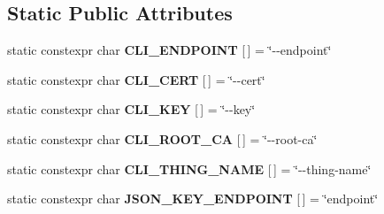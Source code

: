 \subsection*{Static Public Attributes}
\begin{DoxyCompactItemize}
\item 
\mbox{\label{struct_aws_1_1_iot_1_1_device_client_1_1_plain_config_a83c8d156e249b6b76f07c2948471f106}} 
static constexpr char {\bfseries C\+L\+I\+\_\+\+E\+N\+D\+P\+O\+I\+NT} \mbox{[}$\,$\mbox{]} = \char`\"{}-\/-\/endpoint\char`\"{}
\item 
\mbox{\label{struct_aws_1_1_iot_1_1_device_client_1_1_plain_config_a39d731432687c04e6a11599cae19ab80}} 
static constexpr char {\bfseries C\+L\+I\+\_\+\+C\+E\+RT} \mbox{[}$\,$\mbox{]} = \char`\"{}-\/-\/cert\char`\"{}
\item 
\mbox{\label{struct_aws_1_1_iot_1_1_device_client_1_1_plain_config_a09987189e505b253c056c98b1702f772}} 
static constexpr char {\bfseries C\+L\+I\+\_\+\+K\+EY} \mbox{[}$\,$\mbox{]} = \char`\"{}-\/-\/key\char`\"{}
\item 
\mbox{\label{struct_aws_1_1_iot_1_1_device_client_1_1_plain_config_abff94c48ef664a9a40e67e0a7aa375fc}} 
static constexpr char {\bfseries C\+L\+I\+\_\+\+R\+O\+O\+T\+\_\+\+CA} \mbox{[}$\,$\mbox{]} = \char`\"{}-\/-\/root-\/ca\char`\"{}
\item 
\mbox{\label{struct_aws_1_1_iot_1_1_device_client_1_1_plain_config_a882b28082e2c4cfb8c49de8396a71fc9}} 
static constexpr char {\bfseries C\+L\+I\+\_\+\+T\+H\+I\+N\+G\+\_\+\+N\+A\+ME} \mbox{[}$\,$\mbox{]} = \char`\"{}-\/-\/thing-\/name\char`\"{}
\item 
\mbox{\label{struct_aws_1_1_iot_1_1_device_client_1_1_plain_config_ad1a0c4f00c566ae459c6af1bf721d6eb}} 
static constexpr char {\bfseries J\+S\+O\+N\+\_\+\+K\+E\+Y\+\_\+\+E\+N\+D\+P\+O\+I\+NT} \mbox{[}$\,$\mbox{]} = \char`\"{}endpoint\char`\"{}
\item 
\mbox{\label{struct_aws_1_1_iot_1_1_device_client_1_1_plain_config_a151ec4f604e170e6e544366e085159eb}} 

\end{DoxyCompactItemize}
